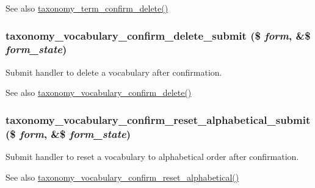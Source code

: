 \begin{DoxySeeAlso}{See also}
\hyperlink{group__forms_gabdfecf623fb2fe428cb6401de1375662}{taxonomy\_\-term\_\-confirm\_\-delete()} 
\end{DoxySeeAlso}
\hypertarget{taxonomy_8admin_8inc_a37c587803cac8e509913d1374e897040}{
\subsubsection[{taxonomy\_\-vocabulary\_\-confirm\_\-delete\_\-submit}]{\setlength{\rightskip}{0pt plus 5cm}taxonomy\_\-vocabulary\_\-confirm\_\-delete\_\-submit (\$ {\em form}, \/  \&\$ {\em form\_\-state})}}
\label{taxonomy_8admin_8inc_a37c587803cac8e509913d1374e897040}
Submit handler to delete a vocabulary after confirmation.

\begin{DoxySeeAlso}{See also}
\hyperlink{group__forms_gaa1e0e524fc8e3642b059c8186a4cd4f8}{taxonomy\_\-vocabulary\_\-confirm\_\-delete()} 
\end{DoxySeeAlso}
\hypertarget{taxonomy_8admin_8inc_a682c533b8249e033ce7e612550c9b68d}{
\subsubsection[{taxonomy\_\-vocabulary\_\-confirm\_\-reset\_\-alphabetical\_\-submit}]{\setlength{\rightskip}{0pt plus 5cm}taxonomy\_\-vocabulary\_\-confirm\_\-reset\_\-alphabetical\_\-submit (\$ {\em form}, \/  \&\$ {\em form\_\-state})}}
\label{taxonomy_8admin_8inc_a682c533b8249e033ce7e612550c9b68d}
Submit handler to reset a vocabulary to alphabetical order after confirmation.

\begin{DoxySeeAlso}{See also}
\hyperlink{group__forms_ga3af4162d583df90dc6511e82d25bf374}{taxonomy\_\-vocabulary\_\-confirm\_\-reset\_\-alphabetical()} 
\end{DoxySeeAlso}

